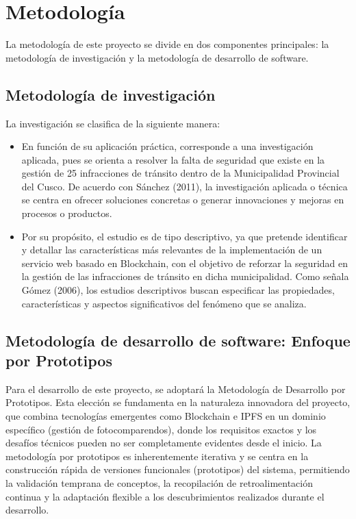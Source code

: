 \section{Metodología }
La metodología de este proyecto se divide en dos componentes principales: la metodología de investigación y la metodología de desarrollo de software.  

\subsection{Metodología de investigación }
La investigación se clasifica de la siguiente manera:
\begin{itemize}
  \item En función de su aplicación práctica, corresponde a una investigación aplicada, pues se orienta a resolver la falta de seguridad que existe en la gestión de 25 infracciones de tránsito dentro de la Municipalidad Provincial del Cusco. De acuerdo con Sánchez (2011), la investigación aplicada o técnica se centra en ofrecer soluciones concretas o generar innovaciones y mejoras en procesos o productos.
  \item Por su propósito, el estudio es de tipo descriptivo, ya que pretende identificar y detallar las características más relevantes de la implementación de un servicio web basado en Blockchain, con el objetivo de reforzar la seguridad en la gestión de las infracciones de tránsito en dicha municipalidad. Como señala Gómez (2006), los estudios descriptivos buscan especificar las propiedades, características y aspectos significativos del fenómeno que se analiza.
\end{itemize}
\subsection{Metodología de desarrollo de software: Enfoque por Prototipos }
Para el desarrollo de este proyecto, se adoptará la Metodología de Desarrollo por Prototipos. Esta elección se fundamenta en la naturaleza innovadora del proyecto, que combina tecnologías emergentes como Blockchain e IPFS en un dominio específico (gestión de fotocomparendos), donde los requisitos exactos y los desafíos técnicos pueden no ser completamente evidentes desde el inicio. La metodología por prototipos es inherentemente iterativa y se centra en la construcción rápida de versiones funcionales (prototipos) del sistema, permitiendo la validación temprana de conceptos, la recopilación de retroalimentación continua y la adaptación flexible a los descubrimientos realizados durante el desarrollo. 